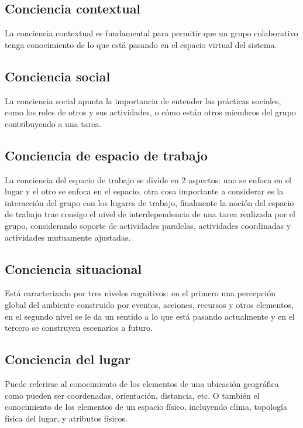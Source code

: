 \subsection{Conciencia contextual}

La conciencia contextual es fundamental para permitir que un grupo colaborativo tenga conocimiento de lo que est\'a pasando en el espacio virtual del sistema.

\subsection{Conciencia social}

La conciencia social \cite{antunes2014reviewing} apunta la importancia de entender las pr\'acticas sociales, como los roles de otros y sus actividades, o c\'omo est\'an otros miembros del grupo contribuyendo a una tarea.

\subsection{Conciencia de espacio de trabajo}

La conciencia del espacio de trabajo se divide en 2 aspectos: uno se enfoca en el lugar y el otro se enfoca en el espacio, otra cosa importante a considerar es la interacci\'on del grupo con los lugares de trabajo, finalmente la noci\'on del espacio de trabajo trae consigo el nivel de interdependencia de una tarea realizada por el grupo, considerando soporte de actividades paralelas, actividades coordinadas y actividades mutuamente ajustadas.

\subsection{Conciencia situacional}

Est\'a caracterizado por tres niveles cognitivos: en el primero una percepci\'on global del ambiente construido por eventos, acciones, recursos y otros elementos, en el segundo nivel se le da un sentido a lo que est\'a pasando actualmente y en el tercero se construyen escenarios a futuro.

\subsection{Conciencia del lugar}

Puede referirse al conocimiento de los elementos de una ubicaci\'on geogr\'afica como pueden ser coordenadas, orientaci\'on, distancia, etc. O tambi\'en el conocimiento de los elementos de un espacio f\'isico, incluyendo clima, topolog\'ia f\'isica del lugar, y atributos f\'isicos.

